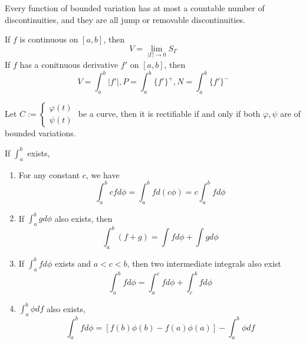 \documentclass[openany]{book}
\begin{document}
\begin{thm}
    Every function of bounded variation has at most a countable number of discontinuities, and they are all jump or removable discontinuities.
\end{thm}
\begin{prop}
    If $f$ is continuous on $[a,b]$, then 
    \begin{equation*}
        V=\lim_{|\Gamma|\to 0}S_\Gamma
    \end{equation*}
    If $f$ has a conitnuous derivative $f'$ on $[a,b]$, then 
    \begin{equation*}
        V=\int_a^b|f'|, P=\int_a^b\{f'\}^+, N=\int_a^b\{f'\}^-
    \end{equation*}
\end{prop}
\begin{prop}
    Let $C:=\begin{cases}
        \varphi(t)\\
        \psi(t)
    \end{cases}$ be a curve, then it is rectifiable if and only if both $\varphi,\psi$ are of bounded variations.
\end{prop}
\begin{prop}
    If $\int_a^b$ exists, 
    \begin{enumerate}
        \item  For any constant $c$, we have 
        \begin{equation*}
            \int_a^bcfd\phi=\int_a^bfd(c\phi)=c\int_a^bfd\phi
        \end{equation*}
        \item If $\int_a^bgd\phi$ also exists, then 
         \begin{equation*}
            \int_a^b(f+g)=\int fd\phi+\int gd\phi
        \end{equation*}
        \item If $\int_a^bfd\phi$ exists and $a<c<b$, then two intermediate integrals also exist 
        \begin{equation*}
            \int_a^bfd\phi=\int_a^cfd\phi+\int_c^bfd\phi
        \end{equation*}
        \item $\int_a^b\phi df$ also exists, 
        \begin{equation*}
            \int_a^bfd\phi=[f(b)\phi(b)-f(a)\phi(a)]-\int_a^b\phi df
        \end{equation*}
    \end{enumerate}
\end{prop}
\end{document}
